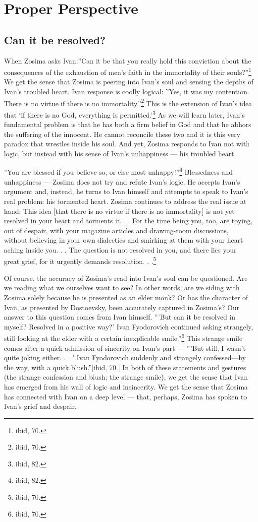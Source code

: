 \chapter{Proper Perspective}
	\section{Can it be resolved?}

When Zosima asks Ivan:''Can it be that you really hold this conviction about the consequences of the exhaustion of men's faith in the immortality of their souls?''\footnote{ibid, 70.} We get the sense that Zosima is peering into Ivan's soul and sensing the depths of Ivan's troubled heart. Ivan response is coolly logical: ''Yes, it was my contention. There is no virtue if there is no immortality.''\footnote{ibid, 70.} This is the extension of Ivan's idea that `if there is no God, everything is permitted.'\footnote{ibid, 82.} As we will learn later, Ivan's fundamental problem is that he has both a firm belief in God and that he abhors the suffering of the innocent. He cannot reconcile these two and it is this very paradox that wrestles inside his soul. And yet, Zosima responds to Ivan not with logic, but instead with his sense of Ivan's unhappiness --- his troubled heart.

''You are blessed if you believe so, or else most unhappy!''\footnote{ibid, 82.} Blessedness and unhappiness --- Zosima does not try and refute Ivan's logic. He accepts Ivan's argument and, instead, he turns to Ivan himself and attempts to speak to Ivan's real problem: his tormented heart. Zosima continues to address the real issue at hand: 
This idea [that there is no virtue if there is no immortality] is not yet resolved in your heart and torments it. ... For the time being you, too, are toying, out of despair, with your magazine articles and drawing-room discussions, without believing in your own dialectics and smirking at them with your heart aching inside you. . . The question is not resolved in you, and there lies your great grief, for it urgently demands resolution. . .\footnote{ibid, 70.}

Of course, the accuracy of Zosima's read into Ivan's soul can be questioned. Are we reading what we ourselves want to see? In other words, are we siding with Zosima solely because he is presented as an elder monk? Or has the character of Ivan, as presented by Dostoevsky, been accurately captured in Zosima's? Our answer to this question comes from Ivan himself. '''But can it be resolved in myself? Resolved in a positive way?' Ivan Fyodorovich continued asking strangely, still looking at the elder with a certain inexplicable smile.''\footnote{ibid, 70.} This strange smile comes after a quick admission of sincerity on Ivan's part --- '''But still, I wasn't quite joking either. . . ' Ivan Fyodorovich suddenly and strangely confessed---by the way, with a quick blush.''[ibid, 70.] In both of these statements and gestures (the strange confession and blush; the strange smile), we get the sense that Ivan has emerged from his wall of logic and insincerity. We get the sense that Zosima has connected with Ivan on a deep level --- that, perhaps, Zosima has spoken to Ivan's grief and despair.


